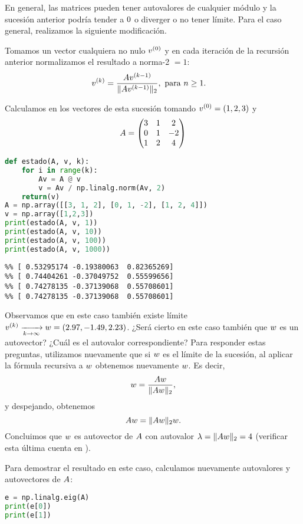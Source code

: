 En general, las matrices pueden tener autovalores de cualquier módulo y la sucesión anterior podría tender a $\cero$ o diverger o no tener límite. Para el caso general, realizamos la siguiente modificación.

Tomamos un vector cualquiera no nulo $\vb^{(0)}$ y en cada iteración de la recursión anterior normalizamos el resultado a norma-2 $= 1$:
$$
\begin{aligned}
\vb^{(k)} &= \frac{\Ab \vb^{(k-1)}}{\|\Ab\vb^{(k-1)}\|_2}, \text{ para } n \ge 1.
\end{aligned}
$$

Calculamos en \python los vectores de esta sucesión tomando $\vb^{(0)} = (1, 2, 3)$ y
$$
\Ab = \begin{pmatrix}
3 & 1 & 2 \\
0 & 1 & -2 \\
1 & 2 & 4
\end{pmatrix}
$$


\begin{Shaded}
\begin{lstlisting}[language=python]
def estado(A, v, k):
    for i in range(k):
        Av = A @ v
        v = Av / np.linalg.norm(Av, 2)
    return(v)
A = np.array([[3, 1, 2], [0, 1, -2], [1, 2, 4]])
v = np.array([1,2,3])
print(estado(A, v, 1))
print(estado(A, v, 10))
print(estado(A, v, 100))
print(estado(A, v, 1000))
\end{lstlisting}
\end{Shaded}

\begin{verbatim}
%% [ 0.53295174 -0.19380063  0.82365269]
%% [ 0.74404261 -0.37049752  0.55599656]
%% [ 0.74278135 -0.37139068  0.55708601]
%% [ 0.74278135 -0.37139068  0.55708601]
\end{verbatim}

Observamos que en este caso también existe límite $\vb^{(k)} \xrightarrow[k \rightarrow \infty]{} \wb = (2.97, -1.49,  2.23)$. ¿Será cierto en este caso también que $\wb$ es un autovector? ¿Cuál es el autovalor correspondiente? Para responder estas preguntas, utilizamos nuevamente que si $\wb$ es el l\'imite de la sucesión, al aplicar la fórmula recursiva a $\wb$ obtenemos nuevamente $\wb$. Es decir,
$$
\wb = \frac{\Ab \wb}{\|\Ab \wb\|_2},
$$
y despejando, obtenemos
$$
\Ab \wb = \|\Ab \wb\|_2 \wb.
$$
Concluimos que $\wb$ es autovector de $\Ab$ con autovalor $\lambda = \|\Ab \wb\|_2 = 4$ (verificar esta última cuenta en \python).

Para demostrar el resultado en este caso, calculamos nuevamente autovalores y autovectores de $\Ab$:
\begin{Shaded}
\begin{lstlisting}[language=python]
e = np.linalg.eig(A)
print(e[0])
print(e[1])
\end{lstlisting}
\end{Shaded}

